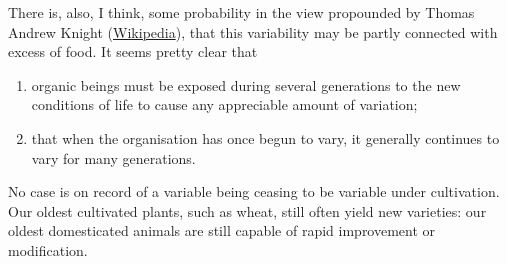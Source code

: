 There is, also, I think, some probability in the view propounded by Thomas Andrew Knight (\href{http://www.wikipedia.org/}{Wikipedia}), that this variability may be partly connected with excess of food. It seems pretty clear that\\

\begin{enumerate}
\item organic beings must be exposed during several generations to the new conditions of life to cause any appreciable amount of variation;
\item that when the organisation has once begun to vary, it generally continues to vary for many generations.
\end{enumerate}

No case is on record of a variable being ceasing to be variable under cultivation. Our oldest cultivated plants, such as wheat, still often yield new varieties: our oldest domesticated animals are still capable of rapid improvement or modification.\\